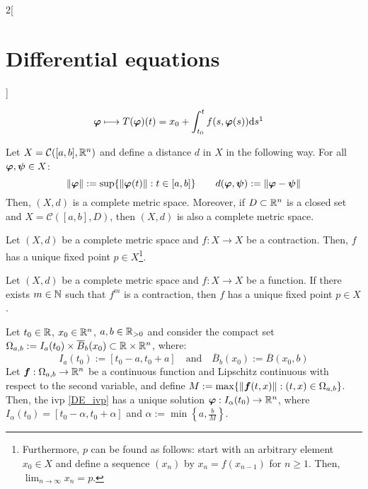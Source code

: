 \documentclass[../../../main.tex]{subfiles}
\begin{document}
\begin{multicols}{2}[\section{Differential equations}]
\begin{definition}
\begin{align*}
      \vectorfunction{\varphi} & \longmapsto T(\vectorfunction{\varphi})(t)=x_0+\int_{t_0}^tf(s,\vectorfunction{\varphi}(s))\dd s\footnotemark
    \end{align*}
  \end{definition}
  \begin{prop}
    Let $X=\mathcal{C}([a,b],\mathbb{R}^n)$ and define a distance $d$ in $X$ in the following way. For all $\boldsymbol{\varphi},\boldsymbol{\psi}\in X$: $$\|\boldsymbol{\varphi}\|:=\sup\{\|\boldsymbol{\varphi}(t)\|:t\in[a,b]\}\qquad d(\boldsymbol{\varphi},\boldsymbol{\psi}):=\|\boldsymbol{\varphi}-\boldsymbol{\psi}\|$$ Then, $(X,d)$ is a complete metric space. Moreover, if $D\subset\mathbb{R}^n$ is a closed set and $X=\mathcal{C}([a,b],D)$, then $(X,d)$ is also a complete metric space.
  \end{prop}
  \begin{theorem}
    Let $(X,d)$ be a complete metric space and $f:X\rightarrow X$ be a contraction. Then, $f$ has a unique fixed point $p\in X$\footnote{Furthermore, $p$ can be found as follows: start with an arbitrary element$x_0\in X$ and define a sequence $(x_n)$ by $x_n=f(x_{n-1})$ for $n\geq 1$. Then, $\lim_{n\to\infty} x_n=p$.}.
  \end{theorem}
  \begin{corollary}
    Let $(X,d)$ be a complete metric space and $f:X\rightarrow X$ be a function. If there exists $m\in\mathbb{N}$ such that $f^m$ is a contraction, then $f$ has a unique fixed point $p\in X$.
  \end{corollary}
  \begin{theorem}\label{DE_picard}
    Let $t_0\in\mathbb{R}$, $x_0\in\mathbb{R}^n$, $a,b\in\mathbb{R}_{>0}$ and consider the compact set $\Omega_{a,b}:=I_a(t_0)\times\overline{B}_{b}(x_0)\subset\mathbb{R}\times\mathbb{R}^n$, where: $$I_a(t_0):=[t_0-a,t_0+a]\quad\text{and}\quad\overline{B}_{b}(x_0):=\overline{B}(x_0,b)$$
    Let $\boldsymbol{f}:\Omega_{a,b}\rightarrow\mathbb{R}^n$ be a continuous function and Lipschitz continuous with respect to the second variable, and define $M:=\max\{\|\boldsymbol{f}(t,x)\|:(t,x)\in\Omega_{a,b}\}$. Then, the ivp \eqref{DE_ivp} has a unique solution $\boldsymbol{\varphi}:I_\alpha(t_0)\rightarrow\mathbb{R}^n$, where $I_\alpha(t_0)=[t_0-\alpha,t_0+\alpha]$ and $\alpha:=\min\left\{a,\frac{b}{M}\right\}$.
  \end{theorem}
  \begin{prop}

\end{prop}
\end{multicols}
\end{document}
